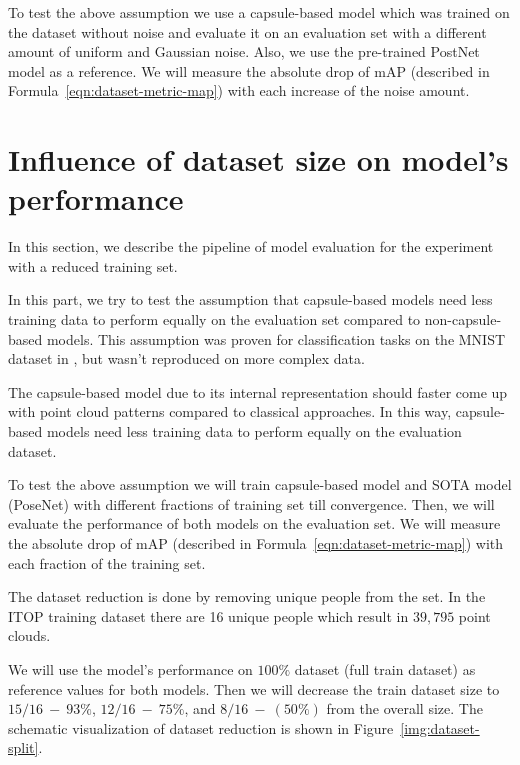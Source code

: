 To test the above assumption we use a capsule-based model which was trained on the dataset without noise and evaluate it on an evaluation set with a different amount of uniform and Gaussian noise. Also, we use the pre-trained PostNet model as a reference.
We will measure the absolute drop of mAP (described in Formula~\ref{eqn:dataset-metric-map}) with each increase of the noise amount.

\section{Influence of dataset size on model's performance}
\label{s:influence-of-dataset-size-on-models-performance}

In this section, we describe the pipeline of model evaluation for the experiment with a reduced training set.

In this part, we try to test the assumption that capsule-based models need less training data to perform equally on the evaluation set compared to non-capsule-based models. This assumption was proven for classification tasks on the MNIST dataset in \cite{sabour_dynamic_2017}, but wasn't reproduced on more complex data.

The capsule-based model due to its internal representation should faster come up with point cloud patterns compared to classical approaches. In this way, capsule-based models need less training data to perform equally on the evaluation dataset.

To test the above assumption we will train capsule-based model and SOTA model (PoseNet) with different fractions of training set till convergence. Then, we will evaluate the performance of both models on the evaluation set. We will measure the absolute drop of mAP (described in Formula~\ref{eqn:dataset-metric-map}) with each fraction of the training set.

The dataset reduction is done by removing unique people from the set. In the ITOP training dataset there are 16 unique people which result in $39,795$ point clouds.

We will use the model's performance on $100\%$ dataset (full train dataset) as reference values for both models. Then we will decrease the train dataset size to $15/16 \  - \ 93\%$, $12/16 \  -\  75\%$, and $8/16 \ - \ (50\%)$ from the overall size. The schematic visualization of dataset reduction is shown in Figure~\ref{img:dataset-split}.

